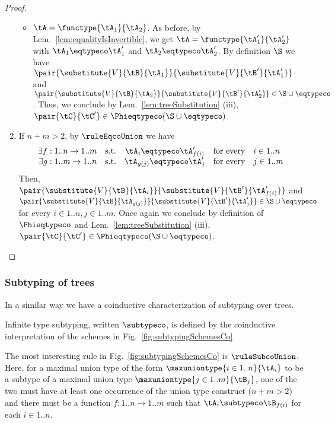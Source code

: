 \begin{proof}
\begin{enumerate}
\begin{itemize}
    \item $\tA = \functype{\tA_1}{\tA_2}$. As before, by
    Lem.~\ref{lem:equalityIsInvertible}, we get $\tA =
    \functype{\tA'_1}{\tA'_2}$ with $\tA_1 \eqtypeco \tA'_1$ and $\tA_2
    \eqtypeco \tA'_2$. By definition $\S$ we have
    $\pair{\substitute{V}{\tB}{\tA_1}}{\substitute{V}{\tB'}{\tA'_1}}$ and
    $\pair{\substitute{V}{\tB}{\tA_2}}{\substitute{V}{\tB'}{\tA'_2}} \in \S
    \cup \mathbin{\eqtypeco}$. Thus, we conclude by
    Lem.~\ref{lem:treeSubstitution} (iii), $\pair{\tC}{\tC'} \in
    \Phieqtypeco\!\left(\S \cup \mathbin{\eqtypeco}\right)$.
  \end{itemize}
  
  \item If $n + m > 2$, by $\ruleEqcoUnion$ we have $$
\begin{array}{r@{\quad\text{s.t.}\quad}c@{\quad\text{for every}\quad}l}
\exists f : 1..n \to 1..m & \tA_i \eqtypeco \tA'_{f(i)} & i \in 1..n \\
\exists g : 1..m \to 1..n & \tA_{g(j)} \eqtypeco \tA'_j & j \in 1..m
\end{array} $$ Then,
  $\pair{\substitute{V}{\tB}{\tA_i}}{\substitute{V}{\tB'}{\tA'_{f(i)}}}$ and
  $\pair{\substitute{V}{\tB}{\tA_{g(j)}}}{\substitute{V}{\tB'}{\tA'_j}} \in \S
  \cup \mathbin{\eqtypeco}$ for every $i \in 1..n, j \in 1..m$. Once again we
  conclude by definition of $\Phieqtypeco$ and Lem.~\ref{lem:treeSubstitution}
  (iii), $\pair{\tC}{\tC'} \in
  \Phieqtypeco\!\left(\S \cup \mathbin{\eqtypeco}\right)$.
\end{enumerate}
\end{proof}


\subsubsection{Subtyping of trees}


In a similar way we have a coinductive characterization of subtyping over trees.

\begin{definition}
Infinite type subtyping, written $\subtypeco$, is defined by the coinductive
interpretation of the schemes in Fig.~\ref{fig:subtypingSchemesCo}. 
\end{definition}

The most interesting rule in Fig.~\ref{fig:subtypingSchemesCo} is
$\ruleSubcoUnion$. Here, for a maximal union type of the form $\maxuniontype{i
\in 1..n}{\tA_i}$ to be a subtype of a maximal union type $\maxuniontype{j \in
1..m}{\tB_j}$, one of the two must have at least one occurrence of the union
type construct ($n + m > 2$) and there must be a function $f : 1..n \to 1..m$
such that $\tA_i \subtypeco \tB_{f(i)}$ for each $i \in 1..n$. 

